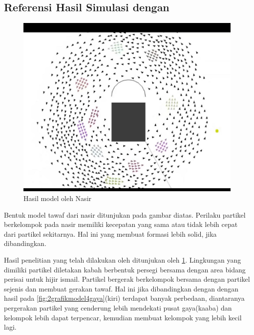 \subsection{Referensi Hasil Simulasi dengan \citep{Nasir2016}}%
\begin{figure}
\centering
\includegraphics[scale=0.4]{gambar/PaperNasir.JPG}
\caption{Hasil model oleh Nasir}
\label{fig:nasir1}
\end{figure}
\hspace{0.6cm}Bentuk model tawaf dari nasir\citep{Nasir2016} ditunjukan pada gambar diatas. Perilaku partikel berkelompok pada nasir memiliki kecepatan yang sama atau tidak lebih cepat dari partikel sekitarnya. Hal ini yang membuat formasi lebih solid, jika dibandingkan.

\hspace{0.6cm} Hasil penelitian yang telah dilakukan oleh \citep{Nasir2016} ditunjukan oleh \ref{fig:nasir1}. Lingkungan yang dimiliki partikel diletakan kabah berbentuk persegi bersama dengan area bidang perisai untuk hijir ismail. Partikel bergerak berkelompok bersama dengan partikel sejenis dan membuat gerakan tawaf. Hal ini jika dibandingkan dengan dengan hasil pada \ref{fig:2grafikmodel4gaya}(kiri) terdapat banyak perbedaan, diantaranya pergerakan partikel yang cenderung lebih mendekati pusat gaya(kaaba) dan kelompok lebih dapat terpencar, kemudian membuat kelompok yang lebih kecil lagi.

